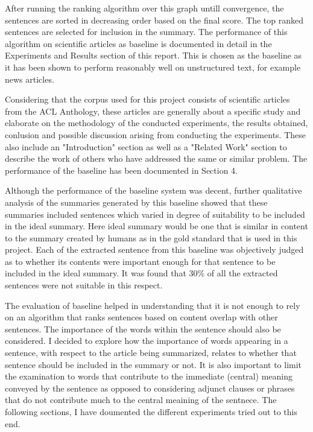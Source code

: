 After running the ranking algorithm over this graph untill convergence, the sentences are sorted in decreasing order based on the final score.
The top ranked sentences are selected for inclusion in the summary.
The performance of this algorithm on scientific articles as baseline is documented in detail in the Experiments and Results section of this report.
This is chosen as the baseline as it has been shown to perform reasonably well on unstructured text, for example news articles.

Considering that the corpus used for this project consists of scientific articles from the ACL Anthology, these articles are generally about a specific study and elaborate on the methodology of the conducted experiments, the results obtained, conlusion and possible discussion arising from conducting the experiments.
These also include an "Introduction" section as well as a "Related Work" section to describe the work of others who have addressed the same or similar problem.
The performance of the baseline has been documented in Section 4.

Although the performance of the baseline system was decent, further qualitative analysis of the summaries generated by this baseline showed that these summaries included sentences which varied in degree of suitability to be included in the ideal summary.
Here ideal summary would be one that is similar in content to the summary created by humans as in the gold standard that is used in this project.
Each of the extracted sentence from this baseline was objectively judged as to whether its contents were important enough for that sentence to be included in the ideal summary.
It was found that 30\% of all the extracted sentences were not suitable in this respect.


The evaluation of baseline helped in understanding that it is not enough to rely on an algorithm that ranks sentences based on content overlap with other sentences.
The importance of the words within the sentence should also be considered.
I decided to explore how the importance of words appearing in a sentence, with respect to the article being summarized, relates to whether that sentence should be included in the summary or not.
It is also important to limit the examination to words that contribute to the immediate (central) meaning conveyed by the sentence as opposed to considering adjunct clauses or phrases that do not contribute much to the central meaining of the sentnece.
The following sections, I have doumented the different experiments tried out to this end.

